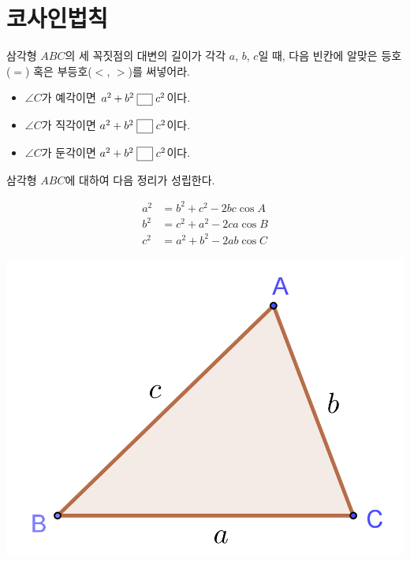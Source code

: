 \documentclass{oblivoir}
\begin{document}
\section{코사인법칙}

%
\label{cos1}
삼각형 \(ABC\)의 세 꼭짓점의 대변의 길이가 각각 \(a\), \(b\), \(c\)일 때,
다음 빈칸에 알맞은 등호(\(=\)) 혹은 부등호(\(<\), \( >\))를 써넣어라.
\begin{mdframed}
\begin{itemize}
\item
\(\angle C\)가 예각이면 \(a^2+b^2\;\pb{=}\; c^2\)이다.
\item
\(\angle C\)가 직각이면 \(a^2+b^2\;\pb{<}\; c^2\)이다.
\item
\(\angle C\)가 둔각이면 \(a^2+b^2\;\pb{>}\; c^2\)이다.
\end{itemize}
\end{mdframed}

\bigskip\bigskip
삼각형 \(ABC\)에 대하여 다음 정리가 성립한다.
\begin{mdframed}
%
\label{cos2}
\begin{minipage}[c]{.6\textwidth}
\begin{align*}
a^2&=b^2+c^2-2bc\cos A\\
b^2&=c^2+a^2-2ca\cos B\\
c^2&=a^2+b^2-2ab\cos C
\end{align*}
\end{minipage}
\begin{minipage}{.3\textwidth}
\begin{center}
\includegraphics[width=\textwidth]{cos_2}
\end{center}
\end{minipage}
\end{mdframed}
\end{document}
